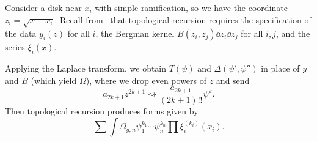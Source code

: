 \documentclass[leqno, openany]{memoir}
\theoremstyle{definition}
\theoremstyle{remark}
\theoremstyle{plain}
\theoremstyle{definition}
\theoremstyle{remark}
\begin{document}
Consider a disk near $x_i$ with simple ramification, so we have the coordinate $z_i = \sqrt{x-x_i}$. Recall from~ that topological recursion requires the specification of the data $y_i(z)$ for all $i$, the Bergman kernel $B(z_i,z_j) \dd{z_i} \dd{z_j}$ for all $i, j$, and the series $\xi_i(x)$.

Applying the Laplace transform, we obtain $T(\psi)$ and $\Delta(\psi',\psi'')$ in place of $y$ and $B$ (which yield $\Omega$), where we drop even powers of $z$ and send
\[ a_{2k+1} z^{2k+1} \rightsquigarrow \frac{a_{2k+1}}{(2k+1)!!} \psi^k. \]
Then topological recursion produces forms given by
\[ \sum \int \Omega_{g,n} \psi_1^{k_1} \cdots \psi_n^{k_n} \prod \xi_i^{(k_i)}(x_i). \]
\end{document}
